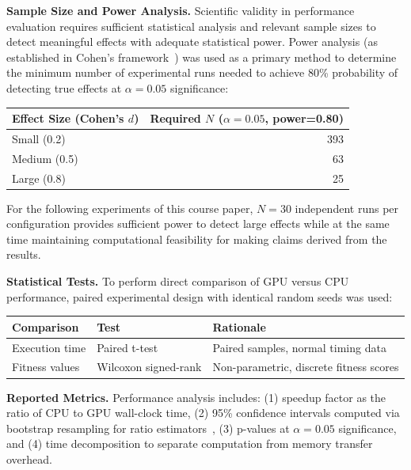 \documentclass[a4paper,14pt]{extarticle}
\begin{document}
\textbf{Sample Size and Power Analysis.} Scientific validity in performance evaluation requires sufficient statistical analysis and relevant sample sizes to detect meaningful effects with adequate statistical power. Power analysis (as established in Cohen's framework~\cite{cohen1988power}) was used as a primary method to determine the minimum number of experimental runs needed to achieve 80\% probability of detecting true effects at $\alpha=0.05$ significance:

\begin{center}
\begin{tabular}{@{}lr@{}}
\toprule
\textbf{Effect Size (Cohen's $d$)} & \textbf{Required $N$ ($\alpha=0.05$, power=0.80)} \\
\midrule
Small (0.2) & 393 \\
Medium (0.5) & 63 \\
Large (0.8) & 25 \\
\bottomrule
\end{tabular}
\end{center}
    
For the following experiments of this course paper, $N=30$ independent runs per configuration provides sufficient power to detect large effects while at the same time maintaining computational feasibility for making claims derived from the results.

\textbf{Statistical Tests.} To perform direct comparison of GPU versus CPU performance, paired experimental design with identical random seeds was used:

\begin{center}
\small
\begin{tabular}{@{}lll@{}}
\toprule
\textbf{Comparison} & \textbf{Test} & \textbf{Rationale} \\
\midrule
Execution time & Paired t-test & Paired samples, normal timing data \\
Fitness values & Wilcoxon signed-rank & Non-parametric, discrete fitness scores \\
\bottomrule
\end{tabular}
\end{center}

\textbf{Reported Metrics.} Performance analysis includes: (1) speedup factor as the ratio of CPU to GPU wall-clock time, (2) 95\% confidence intervals computed via bootstrap resampling for ratio estimators~\cite{efron1994bootstrap}, (3) p-values at $\alpha=0.05$ significance, and (4) time decomposition to separate computation from memory transfer overhead.
\end{document}
